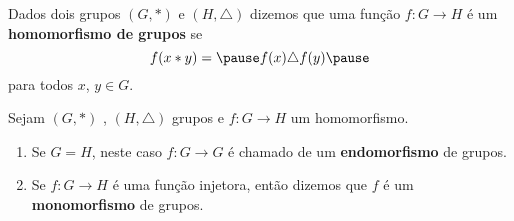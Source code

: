 \documentclass{beamer}
\begin{document}
    \begin{frame}
        \begin{definicao}
            Dados dois grupos $(G, \ast )$ \pause e $(H,\triangle)$ \pause dizemos que uma função $f : G \to H$ \pause é um \textbf{homomorfismo de grupos} se \pause
            \[
                f(x * y) = \pause f(x)\triangle f(y) \pause
            \]
            para todos $x$, $y \in G$.
        \end{definicao}
    \end{frame}

    \begin{frame}
        \begin{observacao}
            Sejam $(G, \ast )$ \pause, $(H, \triangle)$ grupos \pause e $f : G \to H$ um homomorfismo. \pause

            \vspace{.5cm}

            \begin{enumerate}[label={\arabic*})]
                \item Se $G = H$, \pause neste caso $f : G \to G$ \pause é chamado de um \textbf{endomorfismo} de grupos.\pause

                \vspace{.5cm}

                \item Se $f : G \to H$ é uma função injetora, \pause então dizemos que $f$ é um \textbf{monomorfismo} de grupos.\pause

                \vspace{.5cm}

                \seti
            \end{enumerate}
        \end{observacao}
    \end{frame}
\end{document}
